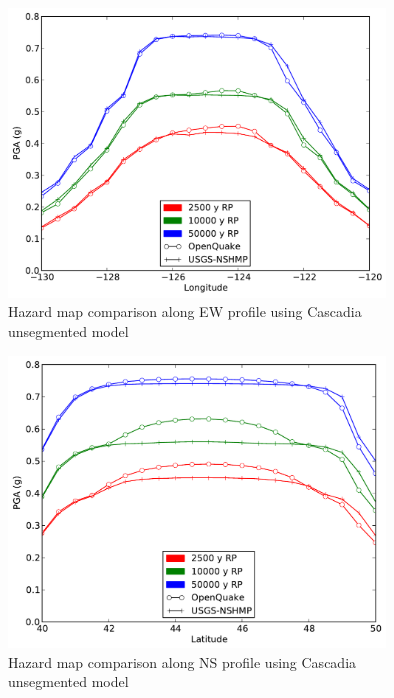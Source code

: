 \begin{figure}
\centering
\includegraphics[width=10cm]{./qareport/pictures/cascadia_float_oq_nshmp_ew.pdf}
\caption{Hazard map comparison along EW profile using Cascadia unsegmented model}
\label{fig:cascadia_float_ew}
\end{figure}
\begin{figure}
\centering
\includegraphics[width=10cm]{./qareport/pictures/cascadia_float_oq_nshmp_ns.pdf}
\caption{Hazard map comparison along NS profile using Cascadia unsegmented model}
\label{fig:cascadia_float_ns}
\end{figure}
